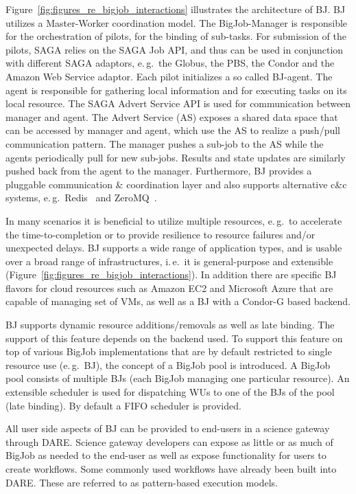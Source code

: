 \documentclass[]{svjour3}
\begin{document}
Figure~\ref{fig:figures_re_bigjob_interactions} illustrates the
architecture of BJ. BJ utilizes a Master-Worker coordination model. The
BigJob-Manager is responsible for the orchestration of pilots, for the
binding of sub-tasks. For submission of the pilots, SAGA relies on the
SAGA Job API, and thus can be used in conjunction with different SAGA
adaptors, e.\,g.\ the Globus, the PBS, the Condor and the Amazon Web
Service adaptor. Each pilot initializes a so called BJ-agent. The
agent is responsible for gathering local information and for executing
tasks on its local resource. The SAGA Advert Service API is used for
communication between manager and agent. The Advert Service (AS)
exposes a shared data space that can be accessed by manager and agent,
which use the AS to realize a push/pull communication pattern.
The manager pushes a sub-job to the AS while the agents periodically pull
for new sub-jobs. Results and state updates are similarly pushed back from
the agent to the manager. Furthermore, BJ provides a pluggable
communication \& coordination layer and also supports alternative c\&c
systems, e.\,g.\ Redis~\cite{redis} and ZeroMQ~\cite{zmq}.

In many scenarios it is beneficial to utilize multiple resources,
e.\,g.\ to accelerate the time-to-completion or to provide resilience
to resource failures and/or unexpected delays. 
BJ supports a wide range of application types, and is usable over a
broad range of infrastructures, i.\,e.\ it is general-purpose and
extensible (Figure~\ref{fig:figures_re_bigjob_interactions}). In
addition there are specific BJ flavors for cloud resources such as
Amazon EC2 and Microsoft Azure that are capable of managing set of
VMs, as well as a BJ with a Condor-G based backend.

BJ supports dynamic resource additions/removals as well as late
binding. The support of this feature depends on the backend used. To
support this feature on top of various BigJob implementations that are
by default restricted to single resource use (e.\,g.\ BJ), the concept
of a BigJob pool is introduced. A BigJob pool consists of multiple BJs
(each BigJob managing one particular resource). An extensible
scheduler is used for dispatching WUs to one of the BJs of the pool
(late binding). By default a FIFO scheduler is provided.

All user side aspects of BJ can be provided to end-users
in a science gateway through DARE. Science gateway developers can
expose as little or as much of BigJob as needed to the end-user as
well as expose functionality for users to create workflows. Some
commonly used workflows have already been built into DARE. These are
referred to as pattern-based execution models.
\end{document}
